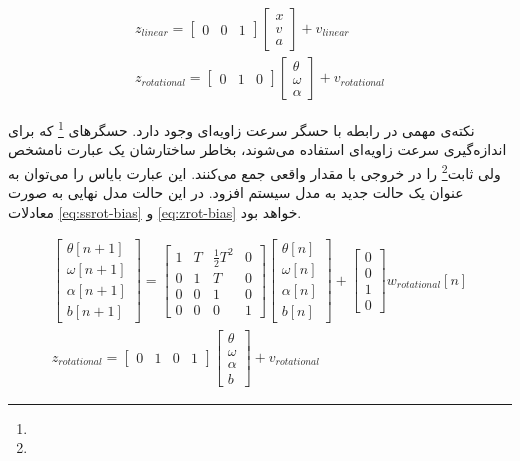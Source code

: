 \begin{gather}
	z_{linear} = 
	\begin{bmatrix}
		0 & 0 & 1
	\end{bmatrix}
	\begin{bmatrix}
		x \\
		v \\
		a
	\end{bmatrix}
	+ v_{linear} 
	\label{eq:zlin} \\
	z_{rotational} = 
	\begin{bmatrix}
		0 & 1 & 0
	\end{bmatrix}
	\begin{bmatrix}
		\theta \\
		\omega \\
		\alpha
	\end{bmatrix}
	+ v_{rotational} 
	\label{eq:zrot}
\end{gather}


نکته‌ی مهمی در رابطه با حسگر سرعت زاویه‌ای وجود دارد. حسگرهای
\footnote{}
که برای اندازه‌گیری سرعت زاویه‌ای استفاده می‌شوند، بخاطر ساختارشان یک عبارت نامشخص ولی ثابت\footnote{} را در خروجی با مقدار واقعی جمع می‌کنند. این عبارت بایاس را می‌توان به عنوان یک حالت جدید به مدل سیستم افزود. در این حالت مدل نهایی به صورت معادلات \ref{eq:ssrot-bias} و \ref{eq:zrot-bias} خواهد بود.

\begin{gather}
	\begin{bmatrix}
		\theta[n+1] \\
		\omega[n+1] \\
		\alpha[n+1] \\
		b[n+1]
	\end{bmatrix}
	=
	\begin{bmatrix}
		1 & T & \frac{1}{2}T^2 & 0\\
		0 & 1 & T & 0\\
		0 & 0 & 1 & 0 \\
		0 & 0 & 0 & 1
	\end{bmatrix}
	\begin{bmatrix}
		\theta[n] \\
		\omega[n] \\
		\alpha[n] \\
		b[n]
	\end{bmatrix}
	+
	\begin{bmatrix}
		0 \\
		0 \\
		1 \\
		0
	\end{bmatrix}
	w_{rotational}[n]
	\label{eq:ssrot-bias} \\
	z_{rotational} = 
	\begin{bmatrix}
		0 & 1 & 0 & 1
	\end{bmatrix}
	\begin{bmatrix}
		\theta \\
		\omega \\
		\alpha \\
		b
	\end{bmatrix}
	+ v_{rotational} 
	\label{eq:zrot-bias}
\end{gather}

